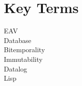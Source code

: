 \documentclass[12pt,a4paper,oneside]{article}
\begin{document}
\frenchspacing

\pagestyle{empty}


\newpage
\pagestyle{fancy}



\section*{Key Terms}
EAV \\
Database \\
Bitemporality \\
Immutability \\
Datalog \\
Lisp \\

\cleardoublepage

\renewcommand{\glsnamefont}[1]{\textbf{#1}}
\doublespacing
\printglossary[title=List of Abbreviations,nonumberlist,type=\acronymtype]
\singlespacing

\cleardoublepage


\tableofcontents{}

\cleardoublepage














\end{document}

